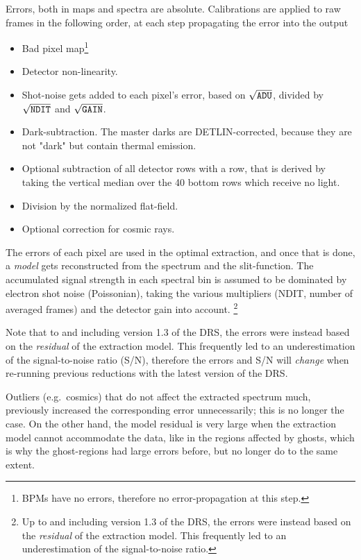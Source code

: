 Errors, both in maps and spectra are absolute. Calibrations are applied to raw
frames in the following order, at each step propagating the error into the
output
\begin{itemize}
    \item Bad pixel map\footnote{BPMs have no errors, therefore no
    error-propagation at this step.}
    \item Detector non-linearity.
    \item Shot-noise gets added to each pixel's error, based on
    $\sqrt{\verb!ADU!}$, divided by $\sqrt{\verb!NDIT!}$ and
    $\sqrt{\verb!GAIN!}$.
    \item Dark-subtraction. The master darks are DETLIN-corrected, because they
    are not "dark" but contain thermal emission.
    \item Optional subtraction of all detector rows with a row, that is derived
    by taking the vertical median over the 40 bottom rows which receive no
    light.
    \item Division by the normalized flat-field.
    \item Optional correction for cosmic rays.
\end{itemize}


The errors of each pixel are used in the optimal extraction, and once that is
done, a \emph{model} gets reconstructed from the spectrum and the slit-function.
The accumulated signal strength in each spectral bin is assumed to be dominated
by electron shot noise (Poissonian), taking the various multipliers (NDIT,
number of averaged frames) and the detector gain into account.
\footnote{Up to and including version 1.3 of the DRS, the errors were instead
 based on the \emph{residual} of the extraction model. This frequently led to
 an underestimation of the signal-to-noise ratio.}

Note that to and including version 1.3 of the DRS, the errors were instead based
on the \emph{residual} of the extraction model. This frequently led to an
underestimation of the signal-to-noise ratio (S/N), therefore the errors and
S/N will \emph{change} when re-running previous reductions with the latest
version of the DRS.

Outliers (e.g.~cosmics) that do not affect the extracted spectrum much,
previously increased the corresponding error unnecessarily; this is no longer
the case. On the other hand, the model residual is very large when the
extraction model cannot accommodate the data, like in the regions affected by
ghosts, which is why the ghost-regions had large errors before, but no longer do
to the same extent.

